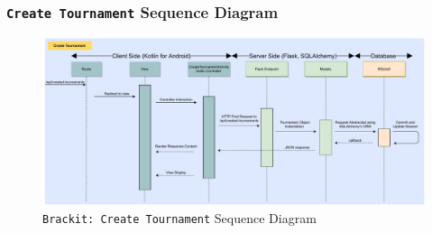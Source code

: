 \documentclass{article}
\begin{document}
\subsubsection{\texttt{Create Tournament} Sequence Diagram}
\vfill
\begin{center}
    \begin{figure}[htp]
        \centering
        \includegraphics[width=16cm]{../diagrams/sequence.pdf}
        \caption{\texttt{Brackit: Create Tournament} Sequence Diagram}
        \end{figure}
\end{center}
\vfill



\clearpage


\end{document}
